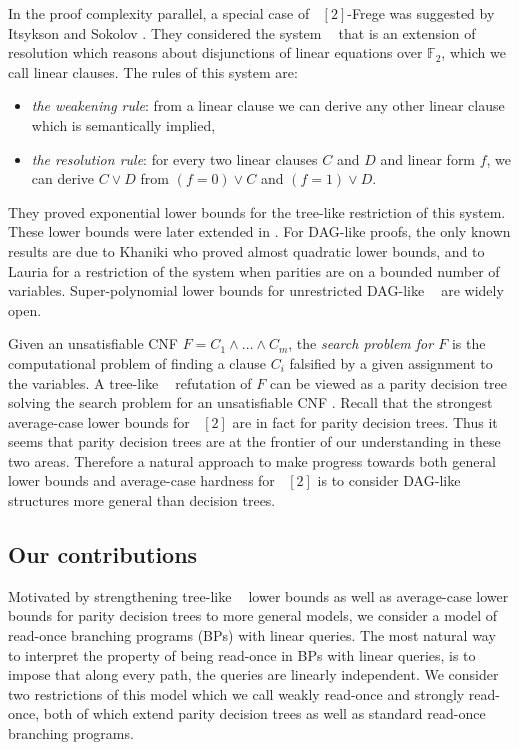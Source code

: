 \documentclass[a4paper,11pt,draft]{article}
\theoremstyle{definition}
\theoremstyle{remark}
\DeclareMathOperator{\ACzero}{\mathsf{AC}^0}
\DeclareMathOperator{\reslin}{\mathsf{Res}[\oplus]}
\newcommand{\bbF}{\mathbb{F}}
\newcommand{\sreadonce}{strongly read-once}
\newcommand{\wreadonce}{weakly read-once}
\begin{document}
In the proof complexity parallel, a special case of $\ACzero[2]$-Frege was suggested by Itsykson and Sokolov \cite{DBLP:journals/apal/ItsyksonS20}. They considered the system $\reslin$ that is an extension of resolution which reasons about disjunctions of linear equations over $\bbF_2$, which we call linear clauses. The rules of this system are:
\begin{itemize}
    \item \emph{the weakening rule}: from a linear clause we can derive any other linear clause which is semantically implied,
    \item \emph{the resolution rule}: for every two linear clauses $C$ and $D$ and linear form $f$, we can derive $C \vee D$ from $(f = 0) \vee C$ and $(f= 1) \vee D$.
\end{itemize}
They proved exponential lower bounds for the tree-like restriction of this system. These lower bounds were later extended in \cite{DBLP:conf/csr/Gryaznov19,DBLP:journals/cc/PartT21}. For DAG-like proofs, the only known results are due to Khaniki \cite{DBLP:journals/eccc/Khaniki20} who proved almost quadratic lower bounds, and to Lauria \cite{DBLP:journals/ipl/Lauria18a} for a restriction of the system when parities are on a bounded number of variables. Super-polynomial lower bounds for unrestricted DAG-like $\reslin$ are widely open.

\bigskip
\noindent{\bf Parity decision trees and tree-like $\reslin$.} Given an unsatisfiable CNF $F = C_1 \wedge \ldots \wedge C_m$, the \emph{search problem for $F$} is the computational problem of finding a clause $C_i$ falsified by a given assignment to the variables. A tree-like $\reslin$ refutation of $F$ can be viewed as a parity decision tree solving the search problem for an unsatisfiable CNF \cite{DBLP:conf/csr/Gryaznov19}. Recall that the strongest average-case lower bounds for $\ACzero[2]$ are in fact for parity decision trees. Thus it seems that parity decision trees are at the frontier of our understanding in these two areas. Therefore a natural approach to make progress towards both general $\reslin$ lower bounds and average-case hardness for $\ACzero[2]$ is to consider DAG-like structures more general than decision trees.

\subsection{Our contributions}

Motivated by strengthening tree-like $\reslin$ lower bounds as well as average-case lower bounds for parity decision trees to more general models, we consider a model of read-once branching programs (BPs) with linear queries. The most natural way to interpret the property of being read-once in BPs with linear queries, is to impose that along every path, the queries are linearly independent. We consider two restrictions of this model which we call \wreadonce{} and \sreadonce{}, both of which extend parity decision trees as well as standard read-once branching programs.
\end{document}

